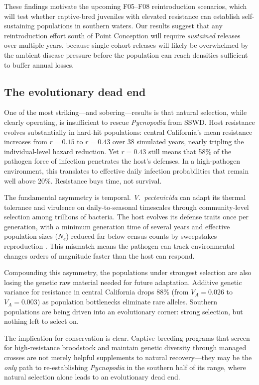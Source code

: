 These findings motivate the upcoming F05--F08 reintroduction scenarios,
which will test whether captive-bred juveniles with elevated resistance
can establish self-sustaining populations in southern waters.  Our
results suggest that any reintroduction effort south of Point
Conception will require \textit{sustained} releases over multiple
years, because single-cohort releases will likely be overwhelmed by the
ambient disease pressure before the population can reach densities
sufficient to buffer annual losses.

\subsection{The evolutionary dead end}

One of the most striking---and sobering---results is that natural
selection, while clearly operating, is insufficient to rescue
\textit{Pycnopodia} from SSWD.  Host resistance evolves substantially
in hard-hit populations: central California's mean resistance increases
from $r = 0.15$ to $r = 0.43$ over 38 simulated years, nearly tripling
the individual-level hazard reduction.  Yet $r = 0.43$ still means that
58\% of the pathogen force of infection penetrates the host's defenses.
In a high-pathogen environment, this translates to effective daily
infection probabilities that remain well above 20\%.  Resistance buys
time, not survival.

The fundamental asymmetry is temporal.  \textit{V.\ pectenicida}
can adapt its thermal tolerance and virulence on daily-to-seasonal
timescales through community-level selection among trillions of
bacteria.  The host evolves its defense traits once per generation,
with a minimum generation time of several years and effective
population sizes ($N_e$) reduced far below census counts by
sweepstakes reproduction \citep{hedgecock2011}.  This mismatch means
the pathogen can track environmental changes orders of magnitude faster
than the host can respond.

Compounding this asymmetry, the populations under strongest selection
are also losing the genetic raw material needed for future adaptation.
Additive genetic variance for resistance in central California drops
88\% (from $V_A = 0.026$ to $V_A = 0.003$) as population bottlenecks
eliminate rare alleles.  Southern populations are being driven into an
evolutionary corner: strong selection, but nothing left to select on.

The implication for conservation is clear.  Captive breeding programs
that screen for high-resistance broodstock \citep{hodin2021} and
maintain genetic diversity through managed crosses are not merely
helpful supplements to natural recovery---they may be the \textit{only}
path to re-establishing \textit{Pycnopodia} in the southern half of
its range, where natural selection alone leads to an evolutionary dead
end.

